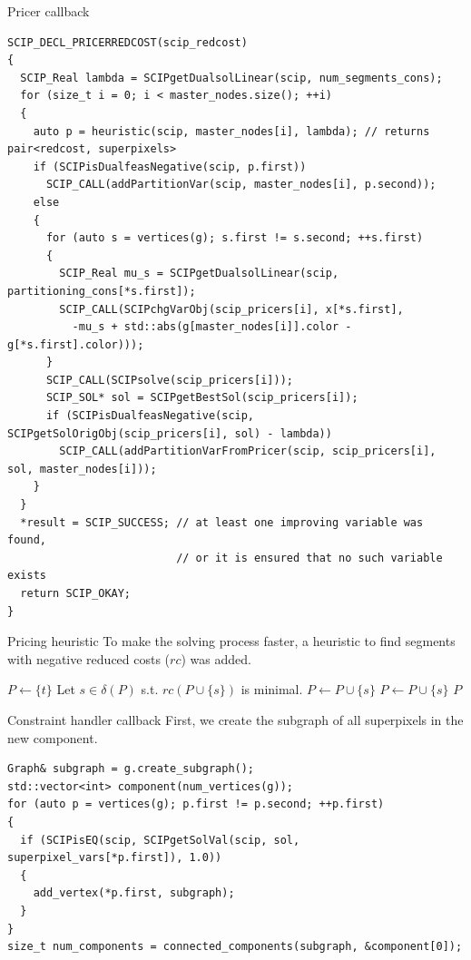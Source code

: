 \documentclass[fleqn]{beamer}
\begin{document}
\begin{frame}[fragile]{Pricer callback}
\begin{verbatim}
SCIP_DECL_PRICERREDCOST(scip_redcost)
{
  SCIP_Real lambda = SCIPgetDualsolLinear(scip, num_segments_cons);
  for (size_t i = 0; i < master_nodes.size(); ++i)
  {
    auto p = heuristic(scip, master_nodes[i], lambda); // returns pair<redcost, superpixels>
    if (SCIPisDualfeasNegative(scip, p.first))
      SCIP_CALL(addPartitionVar(scip, master_nodes[i], p.second));
    else
    {
      for (auto s = vertices(g); s.first != s.second; ++s.first)
      {
        SCIP_Real mu_s = SCIPgetDualsolLinear(scip, partitioning_cons[*s.first]);
        SCIP_CALL(SCIPchgVarObj(scip_pricers[i], x[*s.first],
          -mu_s + std::abs(g[master_nodes[i]].color - g[*s.first].color)));
      }
      SCIP_CALL(SCIPsolve(scip_pricers[i]));
      SCIP_SOL* sol = SCIPgetBestSol(scip_pricers[i]);
      if (SCIPisDualfeasNegative(scip, SCIPgetSolOrigObj(scip_pricers[i], sol) - lambda))
        SCIP_CALL(addPartitionVarFromPricer(scip, scip_pricers[i], sol, master_nodes[i]));
    }
  }
  *result = SCIP_SUCCESS; // at least one improving variable was found,
                          // or it is ensured that no such variable exists
  return SCIP_OKAY;
}
\end{verbatim}
\end{frame}

\begin{frame}{Pricing heuristic}
To make the solving process faster,
a heuristic to find segments with negative reduced costs ($rc$) was added.

\begin{algorithm}[H]
    \caption{Simple pricing heuristic}
    \begin{algorithmic}[1]
        \State $P\gets\{t\}$
        \State Let $s\in\delta(P)$ s.t. $rc(P\cup\{s\})$ is minimal. \label{nextnode}
        \State $P\gets P\cup\{s\}$
        \State {}
        \State $P\gets P\cup\{s\}$
        \State {}
        \Else
        \State \Return $P$
        \EndIf
    \end{algorithmic}
\end{algorithm}
\end{frame}

\begin{frame}[fragile]{Constraint handler callback}
First, we create the subgraph of all superpixels in the new component. 
\begin{verbatim}
Graph& subgraph = g.create_subgraph();
std::vector<int> component(num_vertices(g));
for (auto p = vertices(g); p.first != p.second; ++p.first)
{
  if (SCIPisEQ(scip, SCIPgetSolVal(scip, sol, superpixel_vars[*p.first]), 1.0))
  {
    add_vertex(*p.first, subgraph);
  }
}
size_t num_components = connected_components(subgraph, &component[0]);
 \end{verbatim}
\end{frame}
\end{document}
